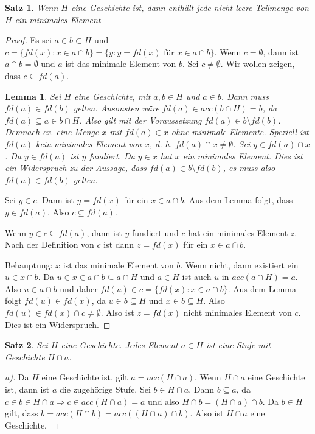 \documentclass[german]{article}
\theoremstyle{break}
\theoremstyle{def_style}
\theoremstyle{def_style}
\newtheorem{satz}{Satz}[section]
\theoremstyle{lemma_style}
\newtheorem{lemma}{Lemma}[subsection]
\begin{document}
\begin{satz}
	Wenn $H$ eine Geschichte ist, dann enthält jede nicht-leere Teilmenge von $H$ ein minimales Element
\end{satz}
\begin{proof}
	Es sei $a\in b \subset H$ und $c=\{fd(x) : x \in a\cap b\}=\{y:y=fd(x)\text{ für } x\in a \cap b\}$.
	Wenn $c=\emptyset$, dann ist $a\cap b = \emptyset$ und $a$ ist das minimale Element von $b$.
	Sei $c\neq \emptyset$. Wir wollen zeigen, dass $c\subseteq fd(a)$.
	
	\begin{lemma}
		Sei $H$ eine Geschichte, mit $a,b\in H$ und $a\in b$. Dann muss $fd(a)\in fd(b)$ gelten. Ansonsten wäre $fd(a)\in acc(b\cap H)=b$, da $fd(a)\subseteq a \in b \cap H$. Also gilt mit der Voraussetzung $fd(a)\in b \setminus fd(b)$. Demnach ex. eine Menge $x$ mit $fd(a)\in x$ ohne minimale Elemente. Speziell ist $fd(a)$ kein minimales Element von $x$, d. h. $fd(a)\cap x \neq \emptyset$. Sei $y\in fd(a)\cap x$. Da $y\in fd(a)$ ist $y$ fundiert. Da $y \in x$ hat $x$ ein minimales Element. Dies ist ein Widerspruch zu der Aussage, dass $fd(a)\in b \setminus fd(b)$, es muss also $fd(a)\in fd(b)$ gelten.
	\end{lemma}

	Sei $y\in c$. Dann ist $y = fd(x)$ für ein $x\in a\cap b$. Aus dem Lemma folgt, dass $y\in fd(a)$. Also $c\subseteq fd(a)$.
	
	Wenn $y\in c \subseteq fd(a)$, dann ist $y$ fundiert und $c$ hat ein minimales Element $z$. Nach der Definition von $c$ ist dann $z=fd(x)$ für ein $x\in a\cap b$.
	
	Behauptung: $x$ ist das minimale Element von $b$. Wenn nicht, dann existiert ein $u \in x \cap b$. Da $u \in x \in a\cap b\subseteq a\cap H$ und $a\in H$ ist auch $u$ in $acc(a\cap H)=a$. Also $u \in a\cap b$ und daher $fd(u)\in c = \{fd(x):x\in a\cap b\}$. Aus dem Lemma folgt $fd(u)\in fd(x)$, da $u\in b \subseteq H$ und $x\in b \subseteq H$. Also $fd(u)\in fd(x)\cap c \neq \emptyset$. Also ist $z=fd(x)$ nicht minimales Element von $c$. Dies ist ein Widerspruch.
\end{proof}

\begin{satz}
	Sei $H$ eine Geschichte. Jedes Element $a\in H$ ist eine Stufe mit Geschichte $H\cap a$.
	\label{ElementVonGeschichteIstStufe}
\end{satz}
\begin{proof}[a)]
	Da $H$ eine Geschichte ist, gilt $a=acc(H\cap a)$. Wenn $H\cap a$ eine Geschichte ist, dann ist $a$ die zugehörige Stufe. Sei $b\in H \cap a$. Dann $b\subseteq a$, da $c\in b \in H\cap a \Rightarrow c \in acc(H\cap a)=a$ und also $H\cap b = (H\cap a)\cap b$. Da $b\in H$ gilt, dass $b=acc(H\cap b) = acc((H\cap a)\cap b)$. Also ist $H\cap a$ eine Geschichte.
\end{proof}
\end{document}
